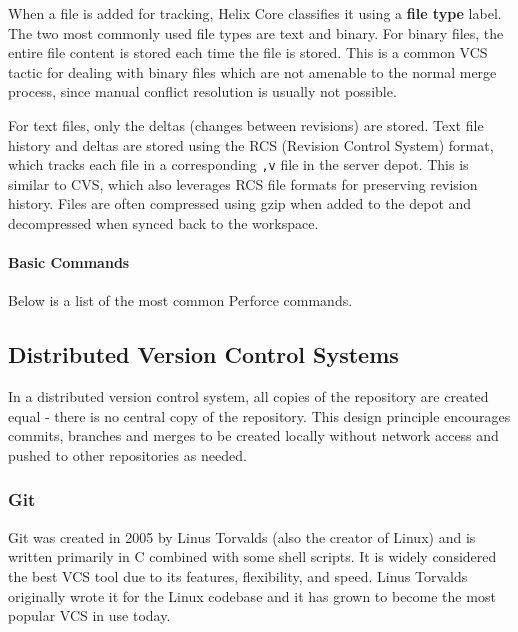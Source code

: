 When a file is added for tracking, Helix Core classifies it using a \textbf{file type} label. The two most commonly used file types are text and binary. For binary files, the entire file content is stored each time the file is stored. This is a common VCS tactic for dealing with binary files which are not amenable to the normal merge process, since manual conflict resolution is usually not possible.

For text files, only the deltas (changes between revisions) are stored. Text file history and deltas are stored using the RCS (Revision Control System) format, which tracks each file in a corresponding \lstinline{,v} file in the server depot. This is similar to CVS, which also leverages RCS file formats for preserving revision history. Files are often compressed using gzip when added to the depot and decompressed when synced back to the workspace.


\paragraph{Basic Commands}

Below is a list of the most common Perforce commands.

\subsection{Distributed Version Control Systems}
In a distributed version control system, all copies of the repository are created equal - there is no central copy of the repository. This design principle encourages commits, branches and merges to be created locally without network access and pushed to other repositories as needed.
\subsubsection{Git}
Git was created in 2005 by Linus Torvalds (also the creator of Linux) and is written primarily in C combined with some shell scripts. It is widely considered the best VCS tool due to its features, flexibility, and speed. Linus Torvalds originally wrote it for the Linux codebase and it has grown to become the most popular VCS in use today.

